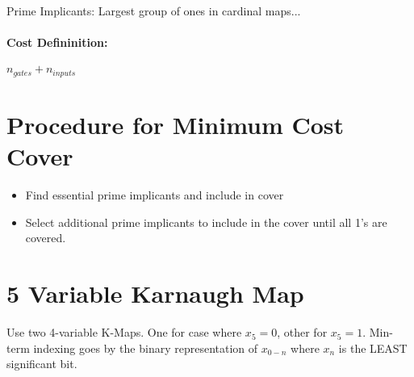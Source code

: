 \documentclass[a4paper,12pt]{report}
\begin{document}
Prime Implicants: Largest group of ones in cardinal maps...

\paragraph{Cost Defininition: } $n_{gates} + n_{inputs}$

\section{Procedure for Minimum Cost Cover}
\begin{itemize}
\item Find essential prime implicants and include in cover
\item Select additional prime implicants to include in the cover until all 1's are covered.
\end{itemize}

\section{5 Variable Karnaugh Map}
Use two 4-variable K-Maps. One for case where $x_5 = 0$, other for $x_5 = 1$.
Min-term indexing goes by the binary representation of $x_{0-n}$ where $x_n$ is the LEAST significant bit.
\end{document}
